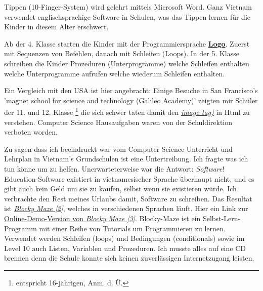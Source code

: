 Tippen (10-Finger-System) wird gelehrt mittels Microsoft Word. Ganz Vietnam verwendet englischsprachige Software in Schulen, was das Tippen lernen für die Kinder in diesem Alter erschwert.

Ab der 4. Klasse starten die Kinder mit der Programmiersprache \href{http://de.wikipedia.org/wiki/Logo_(Programmiersprache)}{\textbf{Logo}}. Zuerst mit Sequenzen von Befehlen, danach mit Schleifen (Loops). In der 5. Klasse schreiben die Kinder Prozeduren (Unterprogramme) welche Schleifen enthalten welche Unterprogramme aufrufen welche wiederum Schleifen enthalten.

Ein Vergleich mit den USA ist hier angebracht: Einige Besuche in San Francisco's 'magnet school for science and technology (Galileo Academy)' zeigten mir Schüler der 11. und 12. Klasse \footnote{entspricht 16-jährigen, Anm. d. Ü.} die sich schwer taten damit den \href{http://de.selfhtml.org/html/grafiken/einbinden.htm#referenz}{\textit{image tag)}} in Html zu verstehen. Computer Science Hausaufgaben waren von der Schuldirektion verboten worden.

Zu sagen dass ich beeindruckt war vom Computer Science Unterricht und Lehrplan in Vietnam's Grundschulen ist eine Untertreibung. Ich fragte was ich tun könne um zu helfen. Unerwarteterweise war die Antwort: \textit{Software}! Education-Software existiert in vietnamesischer Sprache überhaupt nicht, und es gibt auch kein Geld um sie zu kaufen, selbst wenn sie existieren würde.  Ich verbrachte den Rest meines Urlaubs damit, Software zu schreiben. Das Resultat ist \href{https://code.google.com/p/blockly/}{\textit{Blocky Maze [2]}}, welches in verschiedenen Sprachen läuft. Hier ein Link zur \href{http://blockly-demo.appspot.com/static/apps/maze/en.html?level=1}{Online-Demo-Version von \textit{Blocky Maze [3]}}. Blocky-Maze ist ein Selbst-Lern-Programm mit einer Reihe von Tutorials um Programmieren zu lernen. Verwendet werden Schleifen (loops) und Bedingungen (conditionals) sowie im Level 10 auch Listen, Variablen und Prozeduren. Ich musste alles auf eine CD brennen denn die Schule konnte sich keinen zuverlässigen Internetzugang leisten.

